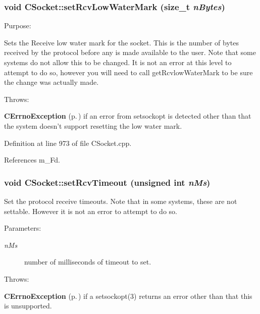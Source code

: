 \subsubsection{\setlength{\rightskip}{0pt plus 5cm}void CSocket::set\-Rcv\-Low\-Water\-Mark (size\_\-t {\em n\-Bytes})}\label{classCSocket_a16}


Purpose:

Sets the Receive low water mark for the socket. This is the number of bytes received by the protocol before any is made available to the user. Note that some systems do not allow  this to be changed. It is not an error at this level to attempt to do so, however you will need to  call get\-Rcvlow\-Water\-Mark to be sure the change was actually made.

Throws:\begin{CompactItemize}
\item 
{\bf CErrno\-Exception} {\rm (p.\,\pageref{classCErrnoException})} if an error from setsockopt is detected other than that the system doesn't support resetting the low water mark. \end{CompactItemize}


Definition at line 973 of file CSocket.cpp.

References m\_\-Fd.
\subsubsection{\setlength{\rightskip}{0pt plus 5cm}void CSocket::set\-Rcv\-Timeout (unsigned int {\em n\-Ms})}\label{classCSocket_a20}


Set the protocol receive timeouts. Note that in some systems, these are not settable. However it is not an error to attempt to do so.\begin{Desc}
\item[Parameters: ]\par
\begin{description}
\item[{\em 
n\-Ms}]number of milliseconds of timeout to set.\end{description}
\end{Desc}
Throws:\begin{CompactItemize}
\item 
{\bf CErrno\-Exception} {\rm (p.\,\pageref{classCErrnoException})} if a setsockopt(3) returns an error other than that this is unsupported. \end{CompactItemize}


